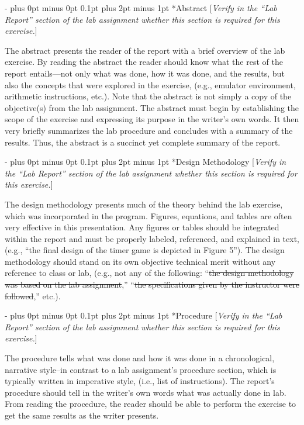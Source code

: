 \documentclass[\FontSize\FontUnit,letterpaper,oneside]{article}
\makeatletter
\renewcommand \section{
    \@startsection{section}{1}{\z@}
      {\dimexpr \FontSize\FontUnit * 2 - \parskip \relax plus 0pt minus 0pt}
      {0.1pt plus 2pt minus 1pt} %
      {\normalfont\normalsize\bfseries}}
\makeatother
\begin{document}
\section*{Abstract}
  [\textit{Verify in the ``Lab Report'' section of the lab assignment 
    whether this section is required for this exercise.}]
\par The abstract presents the reader of the report with a brief overview of 
  the lab exercise.  By reading the abstract the reader should know what 
  the rest of the report entails---not only what was done, how it was 
  done, and the results, but also the concepts that were explored in the 
  exercise, (e.g., emulator environment, arithmetic instructions, etc.).  
  Note that the abstract is not simply a copy of the objective(s) from 
  the lab assignment.  The abstract must begin by establishing the scope 
  of the exercise and expressing its purpose in the writer’s own words.  
  It then very briefly summarizes the lab procedure and concludes with a 
  summary of the results.  Thus, the abstract is a succinct yet complete 
  summary of the report.
\section*{Design Methodology}
[\textit{Verify in the ``Lab Report'' section of the lab assignment 
  whether this section is required for this exercise.}]
\par The design methodology presents much of the theory behind the lab 
  exercise, which was incorporated in the program.  Figures, equations, 
  and tables are often very effective in this presentation.  Any figures 
  or tables should be integrated within the report and must be properly 
  labeled, referenced, and explained in text, (e.g., ``the final design 
  of the timer game is depicted in Figure 5'').  The design methodology 
  should stand on its own objective technical merit without any 
  reference to class or lab, (e.g., not any of the following:  
  ``\sout{the design methodology was based on the lab assignment},''
  ``\sout{the specifications given by the instructor were followed},'' 
  etc.).
\section*{Procedure}
[\textit{Verify in the ``Lab Report'' section of the lab assignment 
  whether this section is required for this exercise.}]
\par The procedure tells what was done and how it was done in a 
  chronological, narrative style--in contrast to a lab assignment’s 
  procedure section, which is typically written in imperative style, 
  (i.e., list of instructions).  The report’s procedure should tell in 
  the writer’s own words what was actually done in lab.  From reading 
  the procedure, the reader should be able to perform the exercise to 
  get the same results as the writer presents.
\end{document}
